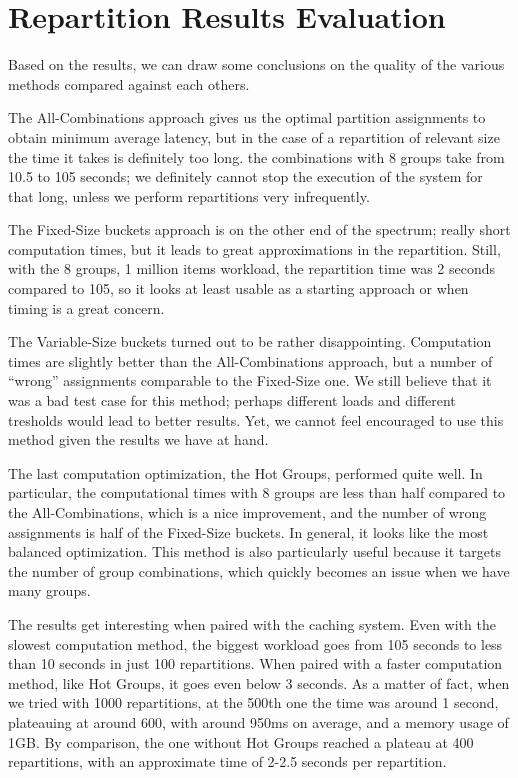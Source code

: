 \clearpage
\section{Repartition Results Evaluation}\label{sec:repartition-results-evaluation}
Based on the results, we can draw some conclusions on the quality of the various methods compared against each others. 

The All-Combinations approach gives us the optimal partition assignments to obtain minimum average latency, but in the case of a repartition of relevant size the time it takes is definitely too long. the combinations with 8 groups take from 10.5 to 105 seconds; we definitely cannot stop the execution of the system for that long, unless we perform repartitions very infrequently.

The Fixed-Size buckets approach is on the other end of the spectrum; really short computation times, but it leads to great approximations in the repartition. Still, with the 8 groups, 1 million items workload, the repartition time was 2 seconds compared to 105, so it looks at least usable as a starting approach or when timing is a great concern.

The Variable-Size buckets turned out to be rather disappointing. Computation times are slightly better than the All-Combinations approach, but a number of ``wrong'' assignments comparable to the Fixed-Size one. We still believe that it was a bad test case for this method; perhaps different loads and different tresholds would lead to better results. Yet, we cannot feel encouraged to use this method given the results we have at hand.

The last computation optimization, the Hot Groups, performed quite well. In particular, the computational times with 8 groups are less than half compared to the All-Combinations, which is a nice improvement, and the number of wrong assignments is half of the Fixed-Size buckets. In general, it looks like the most balanced optimization. This method is also particularly useful because it targets the number of group combinations, which quickly becomes an issue when we have many groups.

The results get interesting when paired with the caching system. Even with the slowest computation method, the biggest workload goes from 105 seconds to less than 10 seconds in just 100 repartitions. When paired with a faster computation method, like Hot Groups, it goes even below 3 seconds. As a matter of fact, when we tried with 1000 repartitions, at the 500th one the time was around 1 second, plateauing at around 600, with around 950ms on average, and a memory usage of 1GB.
By comparison, the one without Hot Groups reached a plateau at 400 repartitions, with an approximate time of 2-2.5 seconds per repartition.

